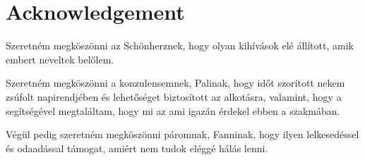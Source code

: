 \chapter*{Acknowledgement}

Szeretn\'{e}m megk\"{o}sz\"{o}nni az Sch\"{o}nherznek, hogy olyan kih\'{i}v\'{a}sok el\'{e} \'{a}ll\'{i}tott, amik embert neveltek bel\H{o}lem.

Szeretn\'{e}m megk\"{o}sz\"{o}nni a konzulensemnek, Palinak, hogy id\H{o}t szor\'{i}tott nekem zs\'{u}folt napirendj\'{e}ben \'{e}s lehet\H{o}s\'{e}get biztos\'{i}tott az alkot\'{a}sra, valamint, hogy a seg\'{i}ts\'{e}g\'{e}vel megtal\'{a}ltam, hogy mi az ami igaz\'{a}n \'{e}rdekel ebben a szakm\'{a}ban.

V\'{e}g\"{u}l pedig szeretn\'{e}m megk\"{o}sz\"{o}nni p\'{a}romnak, Fanninak, hogy ilyen lelkesed\'{e}ssel \'{e}s odaad\'{a}ssal t\'{a}mogat, ami\'{e}rt nem tudok el\'{e}gg\'{e} h\'{a}l\'{a}s lenni.